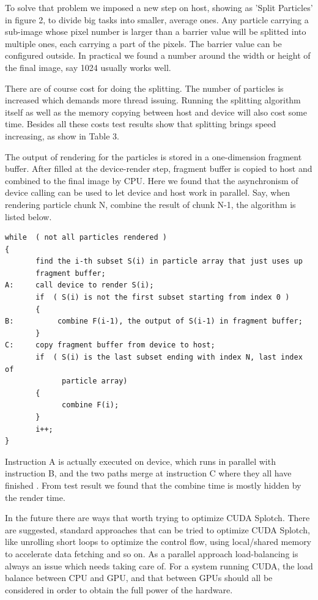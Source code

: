 To solve that problem we imposed a new step on host, showing as 'Split Particles' 
in figure 2, to divide big tasks into smaller, average ones. Any particle
carrying a sub-image whose pixel number is larger than a barrier value will be 
splitted into multiple ones, each carrying a part of the pixels. The barrier value 
can be configured outside. In practical we found a number around the width 
or height of the final image, say 1024 usually works well.

There are of course cost for doing the splitting. The number of particles is 
increased which demands more thread issuing. Running the splitting algorithm itself
as well as the memory copying between host and device will also cost some time. 
Besides all these costs test results show that splitting brings speed increasing, as show in Table 3.

The output of rendering for the particles is stored in a one-dimension fragment buffer. 
After filled at the device-render step, fragment buffer is copied to host
 and combined to the final image by CPU. Here we found that the asynchronism of 
 device calling can be used to let device and host work in parallel. Say, when
rendering particle chunk N, combine the result of chunk N-1, the algorithm is listed below.

\begin{verbatim}
while  ( not all particles rendered )
{
       find the i-th subset S(i) in particle array that just uses up 
       fragment buffer;
A:     call device to render S(i);
       if  ( S(i) is not the first subset starting from index 0 )
       { 
B:          combine F(i-1), the output of S(i-1) in fragment buffer;
       }
C:     copy fragment buffer from device to host;
       if  ( S(i) is the last subset ending with index N, last index of
             particle array)
       {
             combine F(i);
       }
       i++;
}
\end{verbatim}


Instruction A is actually executed on device, which runs in parallel with 
instruction B, and the two paths merge at instruction C where they all have finished
. From test result we found that the combine time is mostly hidden by the render time.

In the future there are ways that worth trying to optimize CUDA Splotch. There are suggested, standard approaches
that can be tried to optimize CUDA Splotch, like unrolling short loops to optimize the control flow, using 
local/shared memory to accelerate data fetching and so on. As a parallel approach load-balancing is always an issue
which needs taking care of. For a system running CUDA, the load balance between CPU and GPU, and that between GPUs
should all be considered in order to obtain the full power of the hardware.



